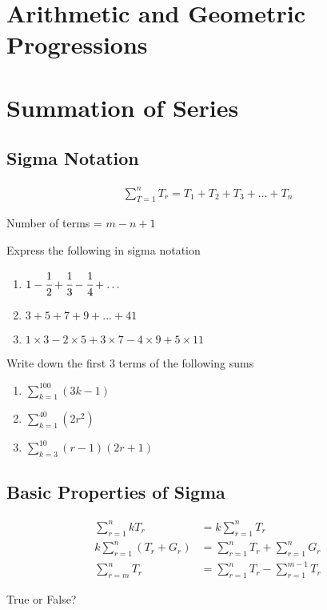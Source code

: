 \documentclass[letterpaper]{article}
\begin{document}
\section{Arithmetic and Geometric Progressions}
\section{Summation of Series}

\subsection{Sigma Notation}

\begin{align*}
\sum_{T=1}^n T_r = T_1 + T_2 + T_3 + \ldots + T_n
\end{align*}

Number of terms = $m - n + 1$

Express the following in sigma notation

\begin{enumerate}
\item $1 - \cfrac{1}{2} + \cfrac{1}{3} - \cfrac{1}{4} + \ldots$
\item $3 + 5 + 7 + 9 + ... + 41$
\item $1 \times 3 - 2 \times 5 + 3 \times 7 - 4 \times 9 + 5 \times 11$
\end{enumerate}

Write down the first 3 terms of the following sums

\begin{enumerate}
\item $\sum_{k=1}^{100} (3k - 1)$
\item $\sum_{k=1}^{40} (2 r^2)$
\item $\sum_{k=3}^{10} (r-1)(2r + 1)$
\end{enumerate}

\subsection{Basic Properties of Sigma}

\begin{align*}
\sum_{r=1}^n kT_r &= k\sum_{r=1}^n T_r \\
k\sum_{r=1}^n (T_r + G_r) &= \sum_{r=1}^n T_r + \sum_{r=1}^n G_r \\
\sum_{r=m}^n T_r &= \sum_{r=1}^n T_r - \sum_{r=1}^{m-1} T_r
\end{align*}

True or False?
\end{document}
